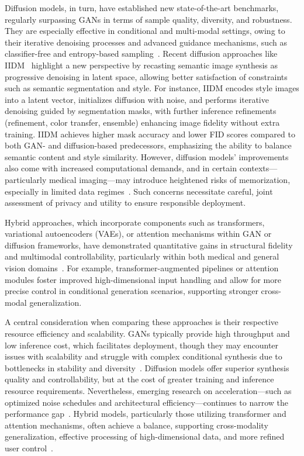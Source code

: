 \documentclass[sigconf]{acmart}
\begin{document}
Diffusion models, in turn, have established new state-of-the-art benchmarks, regularly surpassing GANs in terms of sample quality, diversity, and robustness. They are especially effective in conditional and multi-modal settings, owing to their iterative denoising processes and advanced guidance mechanisms, such as classifier-free and entropy-based sampling~\cite{ref62,ref64,ref91,ref93}. Recent diffusion approaches like IIDM~\cite{ref102} highlight a new perspective by recasting semantic image synthesis as progressive denoising in latent space, allowing better satisfaction of constraints such as semantic segmentation and style. For instance, IIDM encodes style images into a latent vector, initializes diffusion with noise, and performs iterative denoising guided by segmentation masks, with further inference refinements (refinement, color transfer, ensemble) enhancing image fidelity without extra training. IIDM achieves higher mask accuracy and lower FID scores compared to both GAN- and diffusion-based predecessors, emphasizing the ability to balance semantic content and style similarity. However, diffusion models' improvements also come with increased computational demands, and in certain contexts—particularly medical imaging—may introduce heightened risks of memorization, especially in limited data regimes~\cite{ref87,ref95}. Such concerns necessitate careful, joint assessment of privacy and utility to ensure responsible deployment.

Hybrid approaches, which incorporate components such as transformers, variational autoencoders (VAEs), or attention mechanisms within GAN or diffusion frameworks, have demonstrated quantitative gains in structural fidelity and multimodal controllability, particularly within both medical and general vision domains~\cite{ref64,ref65,ref81,ref101}. For example, transformer-augmented pipelines or attention modules foster improved high-dimensional input handling and allow for more precise control in conditional generation scenarios, supporting stronger cross-modal generalization.

A central consideration when comparing these approaches is their respective resource efficiency and scalability. GANs typically provide high throughput and low inference cost, which facilitates deployment, though they may encounter issues with scalability and struggle with complex conditional synthesis due to bottlenecks in stability and diversity~\cite{ref61,ref92,ref102}. Diffusion models offer superior synthesis quality and controllability, but at the cost of greater training and inference resource requirements. Nevertheless, emerging research on acceleration—such as optimized noise schedules and architectural efficiency—continues to narrow the performance gap~\cite{ref64,ref93}. Hybrid models, particularly those utilizing transformer and attention mechanisms, often achieve a balance, supporting cross-modality generalization, effective processing of high-dimensional data, and more refined user control~\cite{ref65,ref81,ref101}.
\end{document}
